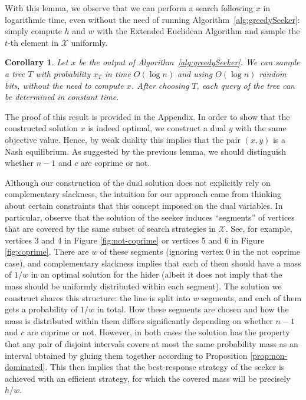 \documentclass[11pt]{article}
\newtheorem{corollary}{Corollary}[section]
\newcommand\+{\mkern2mu}
\newcommand{\T}{T}
\begin{document}
With this lemma, we observe that we can perform a search following $x$ in logarithmic time, even without the need of running Algorithm~\ref{alg:greedySeeker}: simply compute $h$ and $w$ with the Extended Euclidean Algorithm and sample the $t$-th element in $\mathcal{X}$ uniformly.

\begin{corollary}\label{cor:efficientAlg}
Let $x$ be the output of Algorithm~\ref{alg:greedySeeker}. We can sample a tree $\T$ with probability $x_{\T}$ in time $O(\log n)$ and using $O(\log n)$ random bits, without the need to compute $x$. After choosing $\T$, each query of the tree can be determined in constant time. 
\end{corollary}

The proof of this result is provided in the Appendix. In order to show that the constructed solution $x$ is indeed optimal, we construct a dual $y$ with the same objective value. Hence, by weak duality this implies that the pair $(x,y)$ is a Nash equilibrium. As suggested by the previous lemma, we should distinguish whether $n-1$ and $c$ are coprime or not. 

Although our construction of the dual solution does not explicitly rely on complementary slackness, the intuition for our approach came from thinking about certain constraints that this concept imposed on the dual variables. In particular, observe that the solution of the seeker induces ``segments'' of vertices that are covered by the same subset of search strategies in $\mathcal{X}$. See, for example, vertices 3 and 4 in Figure \ref{fig:not-coprime} or vertices 5 and 6 in Figure \ref{fig:coprime}. There are $w$ of these segments (ignoring vertex 0 in the not coprime case), and complementary slackness implies that each of them should have a mass of $1/w$ in an optimal solution for the hider (albeit it does not imply that the mass should be uniformly distributed within each segment). The solution we construct shares this structure: the line is split into $w$ segments, and each of them gets a probability of $1/w$ in total. How these segments are chosen and how the mass is distributed within them differs significantly depending on whether $n-1$ and $c$ are coprime or not. However, in both cases the solution has the property that any pair of disjoint intervals covers at most the same probability mass as an interval obtained by gluing them together according to Proposition \ref{prop:non-dominated}. This then implies that the best-response strategy of the seeker is achieved with an efficient strategy, for which the covered mass will be precisely $h/w$.
\end{document}
